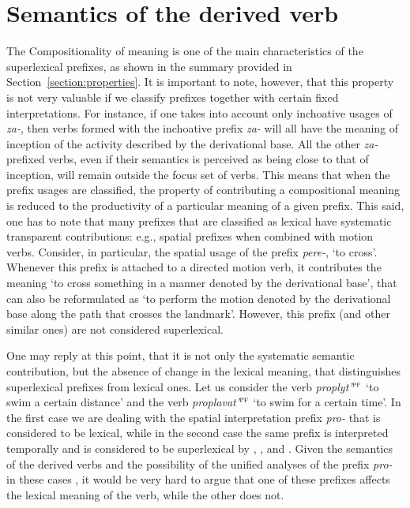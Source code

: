 \section{Semantics of the derived verb}\label{section:new:compositionality}
The Compositionality of meaning is one of the main characteristics of the superlexical prefixes, as shown in the summary provided in Section~\ref{section:properties}. It is important to note, however, that this property is not very valuable if we classify prefixes together with certain fixed interpretations. For instance, if one takes into account only inchoative usages of \textit{za-}, then verbs formed with the inchoative prefix \textit{za-} will all have the meaning of inception of the activity described by the derivational base. All the other \textit{za-}prefixed verbs, even if their semantics is perceived as being close to that of inception, will remain outside the focus set of verbs. This means that when the prefix usages are classified, the property of contributing a compositional meaning is reduced to the productivity of a particular meaning of a given prefix. This said, one has to note that many prefixes that are classified as lexical have systematic transparent contributions: e.g., spatial prefixes when combined with motion verbs. Consider, in particular, the spatial usage of the prefix \textit{pere-}, `to cross'. Whenever this prefix is attached to a directed motion verb, it contributes the meaning `to cross something in a manner denoted by the derivational base', that can also be reformulated as `to perform the motion denoted by the derivational base along the path that crosses the landmark'. However, this prefix (and other similar ones) are not considered superlexical.

One may reply at this point, that it is not only the systematic semantic contribution, but the absence of change in the lexical meaning, that distinguishes superlexical prefixes from lexical ones. Let us consider the verb \textit{proplyt'}$^{\textsc{pf}}$ `to swim a certain distance' and the verb \textit{proplavat'}$^{\textsc{pf}}$ `to swim for a certain time'. In the first case we are dealing with the spatial interpretation prefix \textit{pro-} that is considered to be lexical, while in the second case the same prefix is interpreted temporally and is considered to be superlexical by \citet{Babko-Malaya:99}, \citet{Svenonius:04a}, and \citet{Svenonius:12}. Given the semantics of the derived verbs and the possibility of the unified analyses of the prefix \textit{pro-} in these cases \citep{Kagan:book, ZinovaOsswald:paper}, it would be very hard to argue that one of these prefixes affects the lexical meaning of the verb, while the other does not. 


